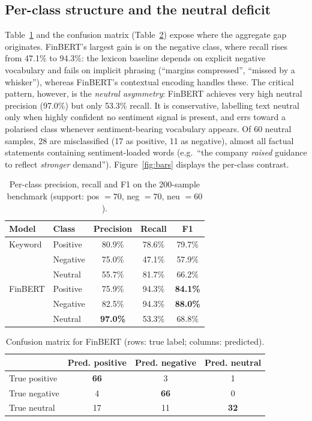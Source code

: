 \documentclass{aims}
\numberwithin{equation}{section}
\begin{document}
\subsection{Per-class structure and the neutral deficit}
Table~\ref{tab:perclass} and the confusion matrix (Table~\ref{tab:cm}) expose where
the aggregate gap originates. FinBERT's largest gain is on the negative class, where
recall rises from 47.1\% to 94.3\%: the lexicon baseline depends on explicit negative
vocabulary and fails on implicit phrasing (``margins compressed'', ``missed by a
whisker''), whereas FinBERT's contextual encoding handles these. The critical
pattern, however, is the \emph{neutral asymmetry}: FinBERT achieves very high neutral
precision (97.0\%) but only 53.3\% recall. It is conservative, labelling text
neutral only when highly confident no sentiment signal is present, and errs toward a
polarised class whenever sentiment-bearing vocabulary appears. Of 60 neutral samples,
28 are misclassified (17 as positive, 11 as negative), almost all factual statements
containing sentiment-loaded words (e.g.\ ``the company \emph{raised} guidance to
reflect \emph{stronger} demand''). Figure~\ref{fig:bars} displays the per-class
contrast.

\begin{table}[ht]
\centering
\caption{Per-class precision, recall and F1 on the 200-sample benchmark (support:
pos $=70$, neg $=70$, neu $=60$).}
\label{tab:perclass}
\begin{tabular}{llccc}
\toprule
\textbf{Model} & \textbf{Class} & \textbf{Precision} & \textbf{Recall} & \textbf{F1} \\
\midrule
Keyword & Positive & 80.9\% & 78.6\% & 79.7\% \\
        & Negative & 75.0\% & 47.1\% & 57.9\% \\
        & Neutral  & 55.7\% & 81.7\% & 66.2\% \\
\midrule
FinBERT & Positive & 75.9\% & 94.3\% & \textbf{84.1\%} \\
        & Negative & 82.5\% & 94.3\% & \textbf{88.0\%} \\
        & Neutral  & \textbf{97.0\%} & 53.3\% & 68.8\% \\
\bottomrule
\end{tabular}
\end{table}

\begin{table}[ht]
\centering
\caption{Confusion matrix for FinBERT (rows: true label; columns: predicted).}
\label{tab:cm}
\begin{tabular}{lccc}
\toprule
 & \textbf{Pred. positive} & \textbf{Pred. negative} & \textbf{Pred. neutral} \\
\midrule
True positive & \textbf{66} & 3 & 1 \\
True negative & 4 & \textbf{66} & 0 \\
True neutral  & 17 & 11 & \textbf{32} \\
\bottomrule
\end{tabular}
\end{table}
\end{document}
